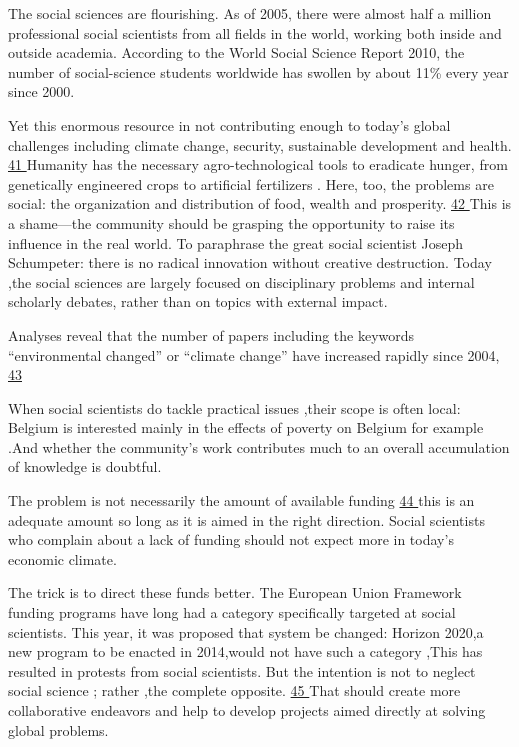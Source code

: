 The social sciences are flourishing. As of 2005, there were almost half a million professional social scientists from all fields in the world, working both inside and outside academia. According to the World Social Science Report 2010, the number of social-science students worldwide has swollen by about 11\% every year since 2000.

Yet this enormous resource in not contributing enough to today’s global challenges including climate change, security, sustainable development and health. \ul{41 \quad\quad\quad\quad\quad\quad\quad\quad\quad\quad\quad\quad} Humanity has the necessary agro-technological tools to eradicate hunger, from genetically engineered crops to artificial fertilizers . Here, too, the problems are social: the organization and distribution of food, wealth and prosperity.
\ul{42 \quad\quad\quad\quad\quad\quad\quad\quad\quad\quad}This is a shame—the community should be grasping the opportunity to raise its influence in the real world. To paraphrase the great social scientist Joseph Schumpeter: there is no radical innovation without creative destruction.
Today ,the social sciences are largely focused on disciplinary problems and internal scholarly debates, rather than on topics with external impact.

Analyses reveal that the number of papers including the keywords “environmental changed” or “climate change” have increased rapidly since 2004, \ul{43 \quad\quad\quad\quad\quad\quad\quad\quad\quad\quad\quad\quad}

When social scientists do tackle practical issues ,their scope is often local: Belgium is interested mainly in the effects of poverty on Belgium for example .And whether the community’s work contributes much to an overall accumulation of knowledge is doubtful.

The problem is not necessarily the amount of available funding \ul{44 \quad\quad\quad\quad\quad\quad\quad\quad\quad\quad\quad\quad} this is an adequate amount so long as it is aimed in the right direction. Social scientists who complain about a lack of funding should not expect more in today’s economic climate.

The trick is to direct these funds better. The European Union Framework funding programs have long had a category specifically targeted at social scientists. This year, it was proposed that system be changed: Horizon 2020,a new program to be enacted in 2014,would not have such a category ,This has resulted in protests from social scientists. But the intention is not to neglect social science ; rather ,the complete opposite. \ul{45 \quad\quad\quad\quad\quad\quad\quad\quad\quad\quad\quad\quad} That should create more collaborative endeavors and help to develop projects aimed directly at solving global problems.

